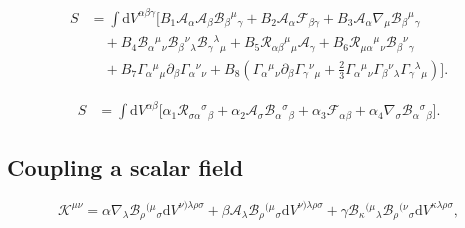 \documentclass{article}
\begin{document}
\begin{equation}
    \label{PAG_3D_action}
    \begin{split}
    S
    & =
    \int  \mathrm{d}V^{\alpha \beta \gamma } \bigg[
    B_1\mathcal{A}_\alpha\mathcal{A}_\beta\mathcal{B}_{\beta}{}^{\mu}{}_{\gamma} 
    + B_2\mathcal{A}_\alpha\mathcal{F}_{\beta\gamma} 
    + B_3\mathcal{A}_\alpha \nabla_\mu \mathcal{B}_{\beta}{}^{\mu}{}_{\gamma} 
    \\
    & \quad
    + B_4\mathcal{B}_{\alpha}{}^{\mu}{}_{\nu}\mathcal{B}_{\beta}{}^{\nu}{}_{\lambda}\mathcal{B}_{\gamma}{}^{\lambda}{}_{\mu} 
    + B_5\mathcal{R}_{\alpha\beta}{}^{\mu}{}_{\mu}\mathcal{A}_{\gamma} 
    + B_6\mathcal{R}_{\mu\alpha}{}^{\mu}{}_{\nu}\mathcal{B}_{\beta}{}^{\nu}{}_{\gamma}
    \\
    & \quad
    + B_7\Gamma_{\alpha}{}^{\mu}{}_{\mu}\partial_\beta \Gamma_{\alpha}{}^{\nu}{}_{\nu}
    + B_8\left(\Gamma_{\alpha}{}^{\mu}{}_{\nu}\partial_\beta \Gamma_{\gamma}{}^{\nu}{}_{\mu} + \frac{2}{3}\Gamma_{\alpha}{}^{\mu}{}_{\nu}\Gamma_{\beta}{}^{\nu}{}_{\lambda}\Gamma_{\gamma}{}^{\lambda}{}_{\mu}\right) \bigg].
    \end{split}
\end{equation}

\begin{equation}
    \label{PAG_2D_action}
    \begin{split}
    S
    & =
    \int  \mathrm{d}V^{\alpha \beta} \bigg[
    \alpha_1\mathcal{R}_{\sigma\alpha}{}^{\sigma}{}_{\beta} 
    + \alpha_2\mathcal{A}_\sigma\mathcal{B}_{\alpha}{}^{\sigma}{}_{\beta} 
    + \alpha_3\mathcal{F}_{\alpha\beta} 
    + \alpha_4\nabla_{\sigma}\mathcal{B}_{\alpha}{}^{\sigma}{}_{\beta}\bigg].
    \end{split}
\end{equation}

\subsection{Coupling a scalar field}
\label{subsec:coupling a scalar field}

\begin{equation}
        \mathcal{K}^{\mu\nu} = \alpha \nabla_\lambda \mathcal{B}_{\rho}{}^{(\mu}{}_{\sigma}\mathrm{d}V^{\nu) \lambda\rho\sigma}
        + \beta \mathcal{A}_\lambda \mathcal{B}_{\rho}{}^{(\mu}{}_{\sigma}\mathrm{d}V^{\nu) \lambda\rho\sigma} 
        + \gamma \mathcal{B}_{\kappa}{}^{(\mu}{}_{\lambda} \mathcal{B}_{\rho}{}^{(\nu}{}_{\sigma}\mathrm{d}V^{\kappa\lambda\rho\sigma},
\end{equation}
\end{document}
